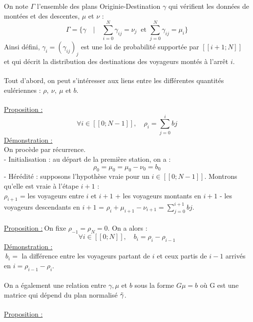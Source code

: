 \documentclass[12pt]{article}
\newcommand{\dcrochetg}{[\![}
\newcommand{\dcrochetd}{]\!]}
\newcommand{\prop}{\underline{Proposition :}}
\newcommand{\demo}{\underline{Démonstration :}}
\begin{document}
On note $\Gamma$ l'ensemble des plans Originie-Destination $\gamma$ qui vérifient les données de montées et des descentes, $\mu$ et $\nu$ :
\[
\Gamma = \{\gamma \quad | \quad \sum^{N}_{i=0} \gamma_{ij} = \nu_j\:\text{ et }  \sum^{N}_{j=0} \gamma_{ij} = \mu_i\}
\]
Ainsi défini, $\gamma_i = (\gamma_{ij})_j$ est une loi de probabilité supportée par $\dcrochetg i+1;N\dcrochetd$ et qui décrit la distribution des destinations des voyageurs montés à l'arrêt $i$.\\
\\
Tout d'abord, on peut s'intéresser aux liens entre les différentes quantités eulériennes : $\rho, \:\nu,\:\mu$ et $b$.\\
\\
\prop \[\forall i \in \dcrochetg0;N-1\dcrochetd, \quad \rho_i = \sum^i_{j=0} bj\]
\demo\\
On procède par récurrence.\\
- Initialisation : au départ de la première station, on a :
\[ \rho_0 = \mu_0 = \mu_0 - \nu_0 = b_0
\]
- Hérédité : supposons l'hypothèse vraie pour un $i \in \dcrochetg0;N-1\dcrochetd$. Montrons qu'elle est vraie à l'étape $i+1$ :\\
\space
$\rho_{i+1}$ = les voyageurs entre $i$ et $i+1$ + les voyageurs montants en $i+1$ - les voyageurs descendants en $i+1$ = $\rho_i + \mu_{i+1} - \nu_{i+1} = \sum^{i+1}_{j=0} bj$.\\
\\
\prop $\:$On fixe $\rho_{-1} = \rho_N = 0$. On a alors :
\[\forall i \in \dcrochetg0;N\dcrochetd, \quad b_i = \rho_i - \rho_{i-1}\]
\demo \\$\: b_i = $ la différence entre les voyageurs partant de $i$ et ceux partis de $i-1$ arrivés en $i = \rho_{i-1} - \rho_i$.\\
\\
On a également une relation entre $\gamma, \mu$ et $b$ sous la forme $G\mu = b$ où G est une matrice qui dépend du plan normalisé $\Tilde{\gamma}$.\\
\\
\prop\\
\end{document}
